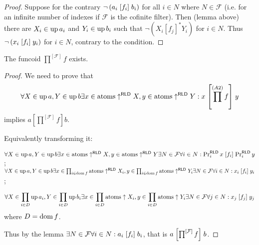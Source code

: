 \begin{proof}
  Suppose for the contrary $\neg \left( a_i \mathrel{\left[f_i\right]} b_i \right)$ for
  all $i \in N$ where $N \in \mathcal{F}$ (i.e. for an infinite number of
  indexes if $\mathcal{F}$ is the cofinite filter). Then (lemma above) there
  are $X_i \in \operatorname{up} a_i$ and $Y_i \in \operatorname{up} b_i$ such that $\neg
  \left( X_i \mathrel{[f_j]^{\ast}} Y_i \right)$ for $i \in N$. Thus $\neg
  \left( x_i \mathrel{\left[f_i\right]} y_i \right)$ for $i \in N$, contrary to the
  condition.
\end{proof}

\begin{prop}
  The funcoid $\prod^{[\mathcal{F}]} f$ exists.
\end{prop}

\begin{proof}
  We need to prove that
  \[ \forall X \in \operatorname{up} a, Y \in \operatorname{up} b \exists x \in \operatorname{atoms}
     \uparrow^{\mathsf{RLD}} X, y \in \operatorname{atoms}
     \uparrow^{\mathsf{RLD}} Y : x \mathrel{\left[ \prod^{(A 2)} f
     \right]} y \]
  implies $a \mathrel{\left[ \prod^{[\mathcal{F}]} f \right]} b$.
  
  Equivalently transforming it: 
  
  $\forall X \in \operatorname{up} a, Y \in \operatorname{up} b \exists x \in \operatorname{atoms}
  \uparrow^{\mathsf{RLD}} X, y \in \operatorname{atoms}
  \uparrow^{\mathsf{RLD}} Y \\  
  \exists N \in \mathcal{F} \forall i \in N : \Pr^{\mathsf{RLD}}_i x
  \mathrel{\left[f_i\right]} \Pr^{\mathsf{RLD}}_i y$; \\
  $\forall X \in \operatorname{up} a, Y \in \operatorname{up} b \exists x \in \prod_{i \in
  \operatorname{dom} f} \operatorname{atoms} \uparrow^{\mathsf{RLD}} X_i, y \in
  \prod_{i \in \operatorname{dom} f} \operatorname{atoms} \uparrow^{\mathsf{RLD}} Y_i \\  
  \exists N \in \mathcal{F} \forall i \in N : x_i \mathrel{\left[f_i\right]} y_i$;

  \[ \forall X \in \prod_{i \in D} \operatorname{up} a_i, Y \in \prod_{i \in D}
     \operatorname{up} b_i \exists x \in \prod_{i \in D} \mathrm{atoms} \uparrow X_i,
     y \in \prod_{i \in D} \mathrm{atoms} \uparrow Y_i \exists N \in
     \mathcal{F} \forall j \in N : x_j \mathrel{[f_j]} y_j \]
  where $D = \operatorname{dom} f$.
  
  Thus by the lemma $\exists N \in \mathcal{F} \forall i \in N : a_i
  \mathrel{\left[f_i\right]} b_i$, that is $a \mathrel{\left[\prod^{[\mathcal{F}]} f\right]} b$.
\end{proof}